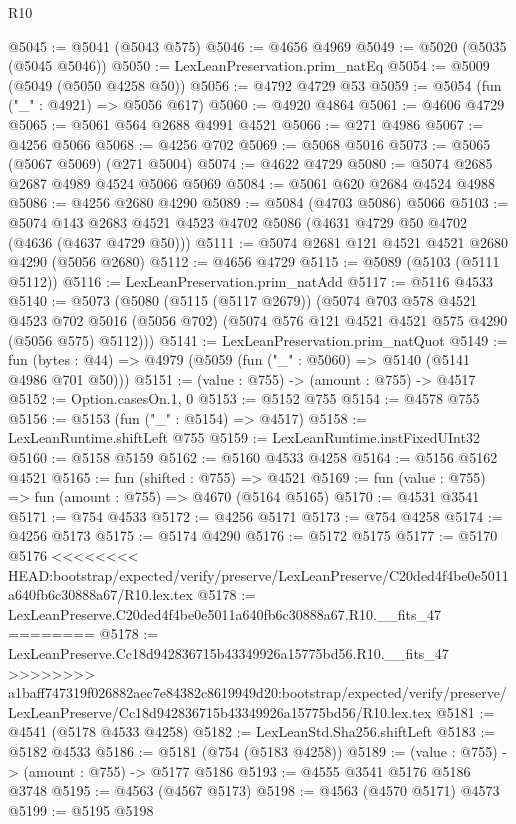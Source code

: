 \begin{lexlean}{R10}
\begin{coremodule}
{{{{{{{{{{{{{{{{{{{{{{{{{{{{{{{{{{{{{{{{{{{{{{{{{{{{{{{{{{{{{{{{{{{{{{{{{{{{{{{{{{{{{{{{{{{{{{{{{{{{{{{{{{{{@5045 := @5041 (@5043 @575)
@5046 := @4656 @4969
@5049 := @5020 (@5035 (@5045 @5046))
@5050 := LexLeanPreservation.prim_natEq
@5054 := @5009 (@5049 (@5050 @4258 @50))
@5056 := @4792 @4729 @53
@5059 := @5054 (fun ("_" : @4921) => @5056 @617)
@5060 := @4920 @4864
@5061 := @4606 @4729
@5065 := @5061 @564 @2688 @4991 @4521
@5066 := @271 @4986
@5067 := @4256 @5066
@5068 := @4256 @702
@5069 := @5068 @5016
@5073 := @5065 (@5067 @5069) (@271 @5004)
@5074 := @4622 @4729
@5080 := @5074 @2685 @2687 @4989 @4524 @5066 @5069
@5084 := @5061 @620 @2684 @4524 @4988
@5086 := @4256 @2680 @4290
@5089 := @5084 (@4703 @5086) @5066
@5103 := @5074 @143 @2683 @4521 @4523 @4702 @5086 (@4631 @4729 @50 @4702 (@4636 (@4637 @4729 @50)))
@5111 := @5074 @2681 @121 @4521 @4521 @2680 @4290 (@5056 @2680)
@5112 := @4656 @4729
@5115 := @5089 (@5103 (@5111 @5112))
@5116 := LexLeanPreservation.prim_natAdd
@5117 := @5116 @4533
@5140 := @5073
    (@5080
      (@5115 (@5117 @2679))
      (@5074
        @703
        @578
        @4521
        @4523
        @702
        @5016
        (@5056 @702)
        (@5074 @576 @121 @4521 @4521 @575 @4290 (@5056 @575) @5112)))
@5141 := LexLeanPreservation.prim_natQuot
@5149 := fun (bytes : @44) => @4979 (@5059 (fun ("_" : @5060) => @5140 (@5141 @4986 @701 @50)))
@5151 := (value : @755) -> (amount : @755) -> @4517
@5152 := Option.casesOn.{1, 0}
@5153 := @5152 @755
@5154 := @4578 @755
@5156 := @5153 (fun ("_" : @5154) => @4517)
@5158 := LexLeanRuntime.shiftLeft @755
@5159 := LexLeanRuntime.instFixedUInt32
@5160 := @5158 @5159
@5162 := @5160 @4533 @4258
@5164 := @5156 @5162 @4521
@5165 := fun (shifted : @755) => @4521
@5169 := fun (value : @755) => fun (amount : @755) => @4670 (@5164 @5165)
@5170 := @4531 @3541
@5171 := @754 @4533
@5172 := @4256 @5171
@5173 := @754 @4258
@5174 := @4256 @5173
@5175 := @5174 @4290
@5176 := @5172 @5175
@5177 := @5170 @5176
<<<<<<<< HEAD:bootstrap/expected/verify/preserve/LexLeanPreserve/C20ded4f4be0e5011a640fb6c30888a67/R10.lex.tex
@5178 := LexLeanPreserve.C20ded4f4be0e5011a640fb6c30888a67.R10.__fits_47
========
@5178 := LexLeanPreserve.Cc18d942836715b43349926a15775bd56.R10.__fits_47
>>>>>>>> a1baff747319f026882aec7e84382c8619949d20:bootstrap/expected/verify/preserve/LexLeanPreserve/Cc18d942836715b43349926a15775bd56/R10.lex.tex
@5181 := @4541 (@5178 @4533 @4258)
@5182 := LexLeanStd.Sha256.shiftLeft
@5183 := @5182 @4533
@5186 := @5181 (@754 (@5183 @4258))
@5189 := (value : @755) -> (amount : @755) -> @5177 @5186
@5193 := @4555 @3541 @5176 @5186 @3748
@5195 := @4563 (@4567 @5173)
@5198 := @4563 (@4570 @5171) @4573
@5199 := @5195 @5198
}}}}}}}}}}}}}}}}}}}}}}}}}}}}}}}}}}}}}}}}}}}}}}}}}}}}}}}}}}}}}}}}}}}}}}}}}}}}}}}}}}}}}}}}}}}}}}}}}}}}}}}}}}}}
\end{coremodule}
\end{lexlean}
